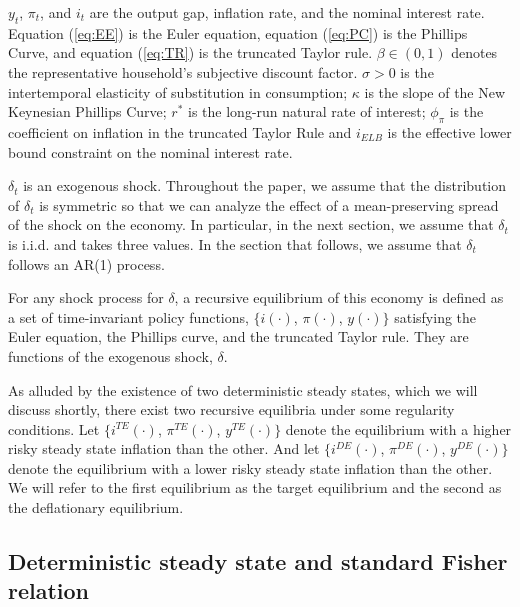 \documentclass[11pt]{article}
\begin{document}
	\noindent $y_t$, $\pi_t$, and $i_t$ are the output gap, inflation rate, and the nominal interest rate. Equation (\ref{eq:EE}) is the Euler equation, equation (\ref{eq:PC}) is the Phillips Curve, and equation (\ref{eq:TR}) is the truncated Taylor rule. $\beta\in(0, 1)$ denotes the representative household's subjective discount factor. $\sigma>0$ is the intertemporal elasticity of substitution in consumption; $\kappa$ is the slope of the New Keynesian Phillips Curve; $r^*$ is the long-run natural rate of interest; $\phi_{\pi}$ is the coefficient on inflation in the truncated Taylor Rule and $i_{ELB}$ is the effective lower bound constraint on the nominal interest rate.
	
	$\delta_t$ is an exogenous shock. Throughout the paper, we assume that the distribution of $\delta_t$ is symmetric so that we can analyze the effect of a mean-preserving spread of the shock on the economy. In particular, in the next section, we assume that $\delta_t$ is i.i.d. and takes three values. In the section that follows, we assume that $\delta_t$ follows an AR(1) process.
	
	For any shock process for $\delta$, a recursive equilibrium of this economy is defined as a set of time-invariant policy functions, $\{i(\cdot)$, $\pi(\cdot)$, $y(\cdot)\}$ satisfying the Euler equation, the Phillips curve, and the truncated Taylor rule. They are functions of the exogenous shock, $\delta$.
	
	As alluded by the existence of two deterministic steady states, which we will discuss shortly, there exist two recursive equilibria under some regularity conditions. Let $\{i^{TE}(\cdot)$, $\pi^{TE}(\cdot)$, $y^{TE}(\cdot)\}$ denote the equilibrium with a higher risky steady state inflation than the other. And let $\{i^{DE}(\cdot)$, $\pi^{DE}(\cdot)$, $y^{DE}(\cdot)\}$ denote the equilibrium with a lower risky steady state inflation than the other. We will refer to the first equilibrium as the target equilibrium and the second as the deflationary equilibrium.
	
	\subsection{Deterministic steady state and standard Fisher relation}
	
\end{document}
